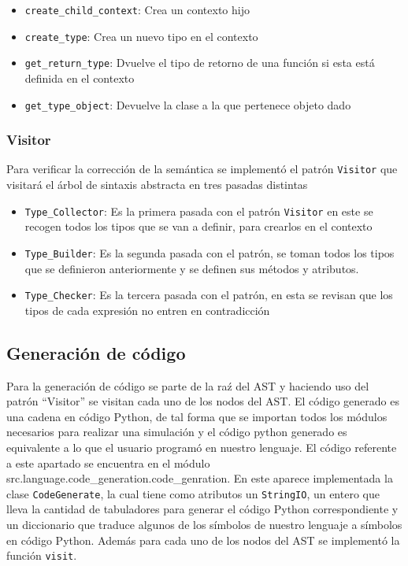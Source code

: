 \begin{itemize}
\begin{itemize}
	\item \verb|create_child_context|: Crea un contexto hijo
	
	\item \verb|create_type|: Crea un nuevo tipo en el contexto
	
	\item \verb|get_return_type|: Dvuelve el tipo de retorno de una funci\'on si esta est\'a definida en el contexto
	
	\item \verb|get_type_object|: Devuelve la clase a la que pertenece objeto dado 
\end{itemize}

\end{itemize}

\subsubsection{Visitor}
Para verificar la correcci\'on de la sem\'antica se implement\'o el patr\'on \verb|Visitor| que visitar\'a el \'arbol de sintaxis abstracta en tres pasadas distintas
\begin{itemize}
\item \verb|Type_Collector|: Es la primera pasada con el patr\'on \verb|Visitor| en este se recogen todos los tipos que se van a definir, para crearlos en el contexto

\item \verb|Type_Builder|: Es la segunda pasada con el patr\'on, se toman todos los tipos que se definieron anteriormente y se definen sus m\'etodos y atributos.

\item \verb|Type_Checker|: Es la tercera pasada con el patr\'on, en esta se revisan que los tipos de cada expresi\'on no entren en contradicci\'on
\end{itemize}

\subsection{Generaci\'on de c\'odigo}

Para la generaci\'on de c\'odigo se parte de la ra\'z del AST y haciendo uso del patr\'on ``Visitor'' se visitan cada uno de los nodos del AST. El c\'odigo generado es una cadena en c\'odigo Python, de tal forma que se importan todos los m\'odulos necesarios para realizar una simulaci\'on y el c\'odigo python generado es equivalente a lo que el usuario program\'o en nuestro lenguaje. El c\'odigo referente a este apartado se encuentra en el m\'odulo src.language.code\_generation.code\_genration. En este aparece implementada la clase \verb|CodeGenerate|, la cual tiene como atributos un \verb|StringIO|, un entero que lleva la cantidad de tabuladores para generar el c\'odigo Python correspondiente y un diccionario que traduce algunos de los s\'imbolos de nuestro lenguaje a s\'imbolos en c\'odigo Python. Adem\'as para cada uno de los nodos del AST se implement\'o la funci\'on \verb|visit|. 


